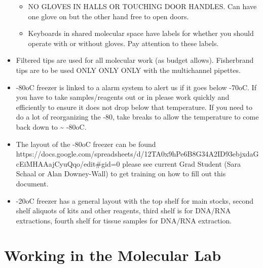 \documentclass[
  letterpaper,
  DIV=11,
  numbers=noendperiod]{scrreprt}
\begin{document}
\begin{itemize}
  \begin{itemize}
  \item
    NO GLOVES IN HALLS OR TOUCHING DOOR HANDLES. Can have one glove on
    but the other hand free to open doors.
  \item
    Keyboards in shared molecular space have labels for whether you
    should operate with or without gloves. Pay attention to these
    labels.
  \end{itemize}
\item
  Filtered tips are used for all molecular work (as budget allows).
  Fisherbrand tips are to be used ONLY ONLY ONLY with the multichannel
  pipettes.
\item
  -80oC freezer is linked to a alarm system to alert us if it goes below
  -70oC. If you have to take samples/reagents out or in please work
  quickly and efficiently to ensure it does not drop below that
  temperature. If you need to do a lot of reorganizing the -80, take
  breaks to allow the temperature to come back down to \textasciitilde{}
  -80oC.
\item
  The layout of the -80oC freezer can be found
  https://docs.google.com/spreadsheets/d/12TA0x9hPe6B8G34A2ID93ebjxdaGcEiMHAAajCyuQqo/edit\#gid=0
  please see current Grad Student (Sara Schaal or Alan Downey-Wall) to
  get training on how to fill out this document.
\item
  -20oC freezer has a general layout with the top shelf for main stocks,
  second shelf aliquots of kits and other reagents, third shelf is for
  DNA/RNA extractions, fourth shelf for tissue samples for DNA/RNA
  extraction.
\end{itemize}

\hypertarget{working-in-the-molecular-lab}{%
\section*{\texorpdfstring{\textbf{Working in the Molecular
Lab}}{Working in the Molecular Lab}}\label{working-in-the-molecular-lab}}
\end{document}
